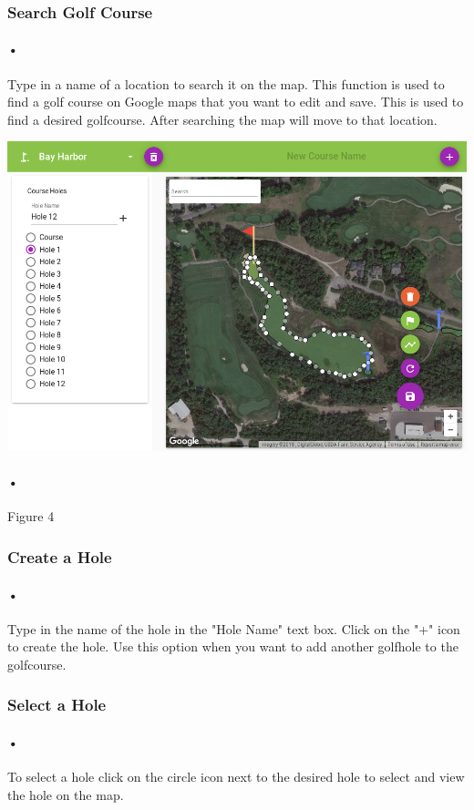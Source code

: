 \documentclass{article}
\begin{document}
	\subsubsection{Search Golf Course}
	\paragraph{•}    
    Type in a name of a location to search it on the map. This function is used to find a golf course on Google maps that you want to edit and save. This is used to find a desired golfcourse. After searching the map will move to that location.
    
    \includegraphics[scale=0.4]{map1}
    \paragraph{•}
    Figure 4
    
    \subsubsection{Create a Hole}
    \paragraph{•}
    Type in the name of the hole in the "Hole Name" text box. Click on the "+" icon to create the hole. Use this option when you want to add another golfhole to the golfcourse.
    
    \subsubsection{Select a Hole}
    \paragraph{•}
    To select a hole click on the circle icon next to the desired hole to select and view the hole on the map.
    
\end{document}
